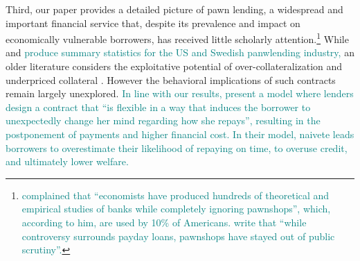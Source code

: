 \documentclass[12pt, a4paper, colorinlistoftodos]{article}
\begin{document}
Third, our paper provides a detailed picture of pawn lending, a widespread and important financial service that, despite its prevalence and impact on economically vulnerable borrowers, has received little scholarly attention.\footnote{\textcolor{teal}{ \cite{Caskey1991} complained that ``economists have produced hundreds of theoretical and empirical studies of banks while completely ignoring pawnshops'', which, according to him, are used by 10\% of Americans. \cite{Bos2012} write that ``while controversy surrounds payday loans, pawnshops have stayed out of public scrutiny''.}} While \cite{Caskey1991} and \cite{Bos2012} \textcolor{teal}{produce summary statistics for the US and Swedish panwlending industry,} an older literature considers the exploitative potential of over-collateralization and underpriced collateral \citep{basu1984implicit}. However the behavioral implications of such contracts remain largely unexplored. %
\textcolor{teal}{In line with our results, \cite{heidhues2010exploiting} present a model where lenders design a contract that ``is flexible in a way that induces the borrower to unexpectedly change her mind regarding how she repays'', resulting in the postponement of payments and higher financial cost. In their model, naivete leads borrowers to overestimate their likelihood of repaying on time, to overuse credit, and ultimately lower welfare.}
\end{document}
